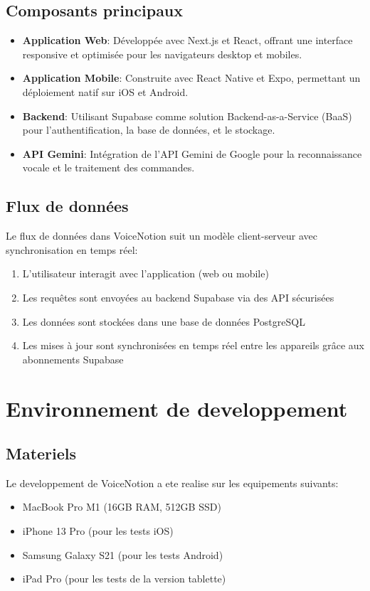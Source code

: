 \subsection{Composants principaux}
\begin{itemize}
    \item \textbf{Application Web}: Développée avec Next.js et React, offrant une interface responsive et optimisée pour les navigateurs desktop et mobiles.
    \item \textbf{Application Mobile}: Construite avec React Native et Expo, permettant un déploiement natif sur iOS et Android.
    \item \textbf{Backend}: Utilisant Supabase comme solution Backend-as-a-Service (BaaS) pour l'authentification, la base de données, et le stockage.
    \item \textbf{API Gemini}: Intégration de l'API Gemini de Google pour la reconnaissance vocale et le traitement des commandes.
\end{itemize}

\subsection{Flux de données}
Le flux de données dans VoiceNotion suit un modèle client-serveur avec synchronisation en temps réel:
\begin{enumerate}
    \item L'utilisateur interagit avec l'application (web ou mobile)
    \item Les requêtes sont envoyées au backend Supabase via des API sécurisées
    \item Les données sont stockées dans une base de données PostgreSQL
    \item Les mises à jour sont synchronisées en temps réel entre les appareils grâce aux abonnements Supabase
\end{enumerate}

\section{Environnement de developpement}
\subsection{Materiels}
Le developpement de VoiceNotion a ete realise sur les equipements suivants:
\begin{itemize}
    \item MacBook Pro M1 (16GB RAM, 512GB SSD)
    \item iPhone 13 Pro (pour les tests iOS)
    \item Samsung Galaxy S21 (pour les tests Android)
    \item iPad Pro (pour les tests de la version tablette)
\end{itemize}

